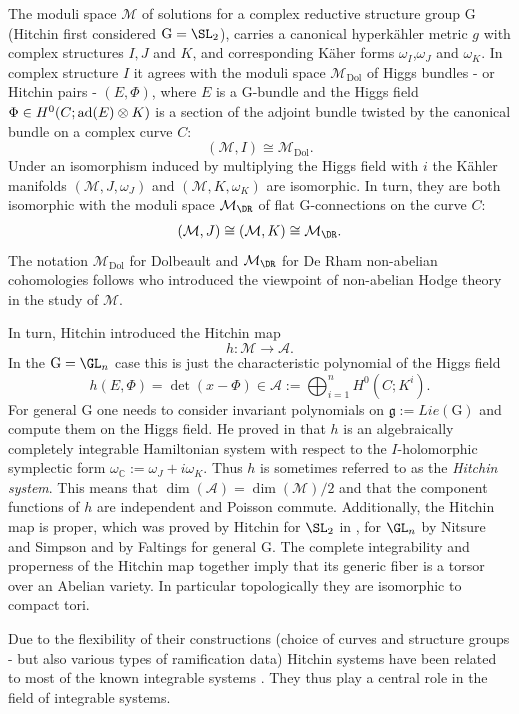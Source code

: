 \documentclass[12pt]{article}
\numberwithin{equation}{section}
\theoremstyle{remark}
\numberwithin{theorem}{section}
\def\beq{\begin{eqnarray}}
\def\eeq{\end{eqnarray}}
\def\A{{\mathcal A}}
\def\C{\mathbb{C}}
\def\M{{\mathcal{M}}}
\def\calA{{\mathcal{A}}}
\newcommand{\g}{\mathfrak{g}}
\newcommand{\ad}{\textnormal{ad}}
\newcommand{\G}{\mathrm{G}}
\newcommand{\Dol}{{\mathrm{Dol}}}
\numberwithin{equation}{section}
\begin{document}
The moduli space $\M$ of solutions for a complex reductive structure group $\G$ (Hitchin first considered $\G=\SL_2$),  carries a canonical hyperk\"ahler metric $g$ with complex structures $I,J$ and $K$, and corresponding K\"aher forms $\omega_I$,$\omega_J$ and $\omega_K$. In complex structure $I$ it agrees with  the moduli space $\M_\Dol$ of Higgs bundles - or Hitchin pairs - $(E,\Phi)$, where $E$ is a $\G$-bundle and  the {Higgs field} $\Phi\in H^0(C;\ad(E) \otimes K)$ is a section of the adjoint bundle twisted by the canonical bundle on a complex curve $C$: $$(\M,I)\cong \M_{\Dol}.$$  Under an isomorphism induced by multiplying the Higgs field with $i$ the K\"ahler manifolds $(\M,J,\omega_J)$ and $(\M,K,\omega_K)$ are isomorphic. In turn, they are  both isomorphic with the moduli space $\M_\DR$ of flat  $\G$-connections on the curve $C$: \beq \label{JK}(\M,J)\cong (\M,K)\cong \M_{\DR}.\eeq The notation $\M_\Dol$ for Dolbeault and $\M_\DR$ for De Rham non-abelian cohomologies follows \cite{simpson} who introduced the viewpoint of non-abelian Hodge theory in the study of $\M$. 

In turn, Hitchin \cite{hitchin-stable} introduced the Hitchin map $$h:\M\to \A.$$ In the $\G=\GL_n$ case this is just the  characteristic polynomial of the Higgs field $$h(E,\Phi)=\det(x-\Phi)\in \calA:=\bigoplus_{i=1}^n H^0(C;K^i).$$ For general $\G$ one needs to consider invariant polynomials on $\g:=Lie(\G)$ and compute them on the Higgs field. He proved in \cite{hitchin-stable} that $h$ is an algebraically completely integrable Hamiltonian system with respect to the $I$-holomorphic symplectic form $\omega_\C:=\omega_J+i\omega_K$.
Thus $h$ is sometimes referred to as the {\em Hitchin system}. This means that $\dim(\A)=\dim(\M)/2$ and that the component functions of $h$ are independent and Poisson commute.  Additionally, the Hitchin map is proper, which was proved by Hitchin for $\SL_2$ in \cite{hitchin-stable}, for $\GL_n$ by Nitsure \cite{nitsure} and Simpson \cite{simpson} and by Faltings \cite{faltings} for general $\G$. The complete integrability and properness of the Hitchin map together imply that its generic fiber is a torsor over an Abelian variety. In particular topologically they are isomorphic to compact tori. 

Due to the flexibility of their constructions (choice of curves and structure groups - but also various types of ramification data) Hitchin systems have been related to most of the known integrable systems \cite{donagi-markman,donagi}. They thus play a central role in the field of integrable systems. 
\end{document}
